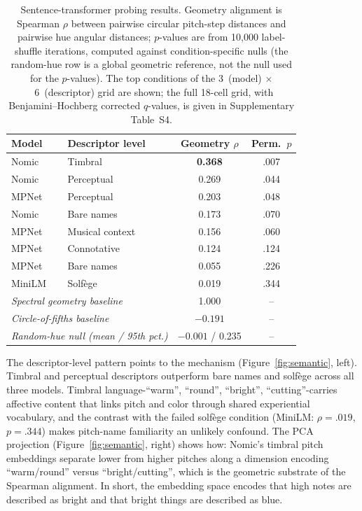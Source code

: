 \documentclass[12pt]{article}
\begin{document}
\begin{table}[htbp]
\centering
\caption{Sentence-transformer probing results. Geometry alignment is
Spearman $\rho$ between pairwise circular pitch-step distances and
pairwise hue angular distances; $p$-values are from 10,000
label-shuffle iterations, computed against condition-specific nulls
(the random-hue row is a global geometric reference, not the null used
for the $p$-values). The top conditions of the 3~(model)
$\times$~6~(descriptor) grid are shown; the full 18-cell grid, with
Benjamini--Hochberg corrected $q$-values, is given in Supplementary
Table~S4.}
\label{tab:lm_probing}
\begin{tabular}{@{}llcc@{}}
\toprule
\textbf{Model} & \textbf{Descriptor level} &
  \textbf{Geometry $\rho$} & \textbf{Perm.\ $p$} \\
\midrule
Nomic  & Timbral         & \textbf{0.368} & .007 \\
Nomic  & Perceptual      & 0.269          & .044 \\
MPNet  & Perceptual      & 0.203          & .048 \\
Nomic  & Bare names      & 0.173          & .070 \\
MPNet  & Musical context & 0.156          & .060 \\
MPNet  & Connotative     & 0.124          & .124 \\
MPNet  & Bare names      & 0.055          & .226 \\
MiniLM & Solf\`{e}ge     & 0.019          & .344 \\
\midrule
\multicolumn{2}{l}{\textit{Spectral geometry baseline}} & 1.000 & -- \\
\multicolumn{2}{l}{\textit{Circle-of-fifths baseline}} & $-0.191$ & -- \\
\multicolumn{2}{l}{\textit{Random-hue null (mean / 95th pct.)}}
  & $-0.001$ / 0.235 & -- \\
\bottomrule
\end{tabular}
\end{table}

The descriptor-level pattern points to the mechanism
(Figure~\ref{fig:semantic}, left). Timbral and perceptual descriptors
outperform bare names and solfège across all three models. Timbral
language-``warm'', ``round'', ``bright'', ``cutting''-carries
affective content that links pitch and color through shared experiential
vocabulary, and the contrast with the failed solfège condition (MiniLM:
$\rho = .019$, $p = .344$) makes pitch-name familiarity an unlikely
confound. The PCA projection (Figure~\ref{fig:semantic}, right) shows
how: Nomic's timbral pitch embeddings separate lower from higher pitches
along a dimension encoding ``warm/round'' versus ``bright/cutting'',
which is the geometric substrate of the Spearman alignment. In short,
the embedding space encodes that high notes are described as bright and
that bright things are described as blue.
\end{document}
